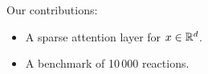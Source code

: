 Our contributions:
\begin{itemize}
  \item A sparse attention layer for $x \in \mathbb{R}^d$.
  \item A benchmark of 10\,000 reactions.
\end{itemize}
